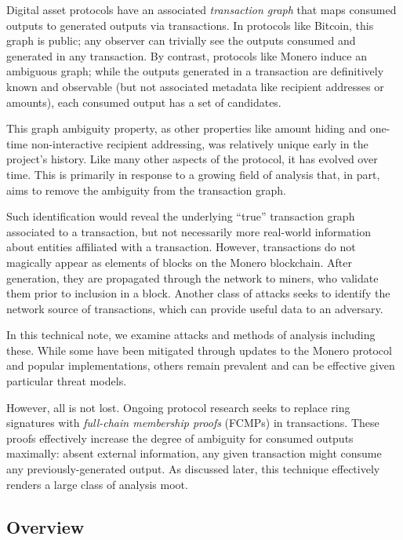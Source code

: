 \documentclass{article}
\theoremstyle{definition}
\begin{document}
Digital asset protocols have an associated \textit{transaction graph} that maps consumed outputs to generated outputs via transactions.
In protocols like Bitcoin, this graph is public; any observer can trivially see the outputs consumed and generated in any transaction.
By contrast, protocols like Monero induce an ambiguous graph; while the outputs generated in a transaction are definitively known and observable (but not associated metadata like recipient addresses or amounts), each consumed output has a set of candidates.

This graph ambiguity property, as other properties like amount hiding and one-time non-interactive recipient addressing, was relatively unique early in the project's history.
Like many other aspects of the protocol, it has evolved over time.
This is primarily in response to a growing field of analysis that, in part, aims to remove the ambiguity from the transaction graph.

Such identification would reveal the underlying ``true'' transaction graph associated to a transaction, but not necessarily more real-world information about entities affiliated with a transaction.
However, transactions do not magically appear as elements of blocks on the Monero blockchain.
After generation, they are propagated through the network to miners, who validate them prior to inclusion in a block.
Another class of attacks seeks to identify the network source of transactions, which can provide useful data to an adversary.

In this technical note, we examine attacks and methods of analysis including these.
While some have been mitigated through updates to the Monero protocol and popular implementations, others remain prevalent and can be effective given particular threat models.

However, all is not lost.
Ongoing protocol research seeks to replace ring signatures with \textit{full-chain membership proofs} (FCMPs) in transactions.
These proofs effectively increase the degree of ambiguity for consumed outputs maximally: absent external information, any given transaction might consume any previously-generated output.
As discussed later, this technique effectively renders a large class of analysis moot.


\subsection{Overview}
\end{document}
